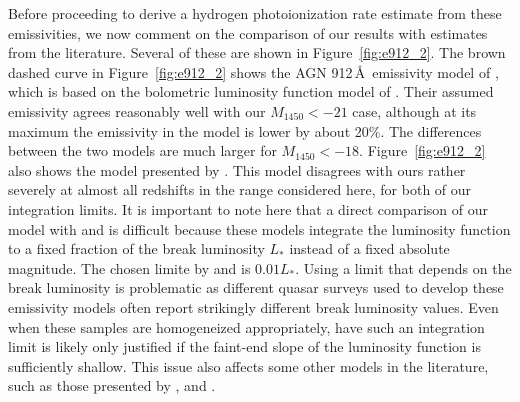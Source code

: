 \documentclass[fleqn,usenatbib]{mnras}
\begin{document}
Before proceeding to derive a hydrogen photoionization rate estimate
from these emissivities, we now comment on the comparison of our
results with estimates from the literature.  Several of these are
shown in Figure~\ref{fig:e912_2}.  The brown dashed curve in
Figure~\ref{fig:e912_2} shows the AGN 912\,\AA\ emissivity model of
\citet{2012ApJ...746..125H}, which is based on the bolometric
luminosity function model of \citet{2007ApJ...654..731H}.  Their
assumed emissivity agrees reasonably well with our $M_{1450}<-21$
case, although at its maximum the emissivity in the
\citet{2007ApJ...654..731H} model is lower by about 20\%.  The
differences between the two models are much larger for $M_{1450}<-18$.
Figure~\ref{fig:e912_2} also shows the model presented by
\citet{2015ApJ...813L...8M}.  This model disagrees with ours rather
severely at almost all redshifts in the range considered here, for
both of our integration limits.  It is important to note here that a
direct comparison of our model with \citet{2012ApJ...746..125H} and
\citet{2015ApJ...813L...8M} is difficult because these models
integrate the luminosity function to a fixed fraction of the break
luminosity $L_*$ instead of a fixed absolute magnitude.  The chosen
limite
by \citet{2012ApJ...746..125H} and \citet{2015ApJ...813L...8M}
is $0.01L_*$.  Using a limit that depends on the break luminosity is
problematic as different quasar surveys used to develop these
emissivity models often report strikingly different break luminosity
values.  Even when these samples are homogeneized appropriately, have
such an integration limit is likely only justified if the faint-end
slope of the luminosity function is sufficiently shallow.  This issue
also affects some other models in the literature, such as those
presented by \citet{2015AA...578A..83G}, \citet{2015MNRAS.451L..30K}
and \citet{2018arXiv180104931P}.
\end{document}
